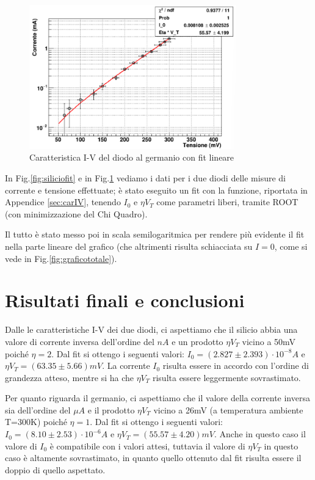 \documentclass[a4paper, 11pt]{article}
\begin{document}
\begin{figure}[!htb]
    \centering
    \includegraphics[width = 0.8\textwidth]{Immagini - Prima prova/Fit germanio.png}
    \caption{Caratteristica I-V del diodo al germanio con fit lineare}
    \label{fig:germaniofit}
\end{figure}

In Fig.\ref{fig:siliciofit} e in Fig.\ref{fig:germaniofit} vediamo i dati per i due diodi delle misure di corrente e tensione effettuate; è stato eseguito un fit con la funzione, riportata in Appendice \ref{sec:carIV}, tenendo $I_0$ e $\eta V_T$ come parametri liberi, tramite ROOT (con minimizzazione del Chi Quadro).

Il tutto è stato messo poi in scala semilogaritmica per rendere più evidente il fit nella parte lineare del grafico (che altrimenti risulta schiacciata su $I = 0$, come si vede in Fig.\ref{fig:graficototale}).

\section{Risultati finali e conclusioni}
Dalle le caratteristiche I-V dei due diodi, ci aspettiamo che il silicio  abbia una valore di corrente inversa dell'ordine del $nA$ e un prodotto $\eta V_T$ vicino a 50mV poiché $\eta = 2 $.  Dal fit si ottengo i seguenti valori: $I_0 = ( 2.827 \pm 2.393) \cdot 10^{-8} A$ e $\eta V_T = (63.35 \pm 5.66) mV  $. La corrente $I_0$ risulta essere in accordo con l'ordine di grandezza atteso, mentre si ha che $\eta V_T$ risulta essere leggermente sovrastimato.

Per quanto riguarda il germanio, ci aspettiamo che il valore della corrente inversa sia dell'ordine del $\mu A$ e il prodotto $\eta V_T$ vicino a 26mV (a temperatura ambiente T=300K) poiché $\eta = 1$. Dal fit si ottengo i seguenti valori: $I_0 = ( 8.10 \pm 2.53) \cdot 10^{-6} A $ e $\eta V_T = ( 55.57 \pm 4.20) mV$. Anche in questo caso il valore di $I_0$ è compatibile con i valori attesi, tuttavia il valore di $\eta V_T$ in questo caso è altamente sovrastimato, in quanto quello ottenuto dal fit risulta essere il doppio di quello aspettato.
\end{document}
